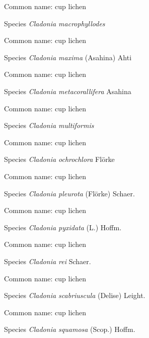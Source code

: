 \documentclass[9pt, article]{memoir}
\begin{document}
\begin{multicols}{2}
Common name: cup lichen

\vspace{6pt}\noindent\hspace{36pt}Species \textit{Cladonia macrophyllodes}


Common name: cup lichen

\vspace{6pt}\noindent\hspace{36pt}Species \textit{Cladonia maxima} (Asahina) Ahti


Common name: cup lichen

\vspace{6pt}\noindent\hspace{36pt}Species \textit{Cladonia metacorallifera} Asahina


Common name: cup lichen

\vspace{6pt}\noindent\hspace{36pt}Species \textit{Cladonia multiformis}


Common name: cup lichen

\vspace{6pt}\noindent\hspace{36pt}Species \textit{Cladonia ochrochlora} Flörke


Common name: cup lichen

\vspace{6pt}\noindent\hspace{36pt}Species \textit{Cladonia pleurota} (Flörke) Schaer.


Common name: cup lichen

\vspace{6pt}\noindent\hspace{36pt}Species \textit{Cladonia pyxidata} (L.) Hoffm.


Common name: cup lichen

\vspace{6pt}\noindent\hspace{36pt}Species \textit{Cladonia rei} Schaer.


Common name: cup lichen

\vspace{6pt}\noindent\hspace{36pt}Species \textit{Cladonia scabriuscula} (Delise) Leight.


Common name: cup lichen

\vspace{6pt}\noindent\hspace{36pt}Species \textit{Cladonia squamosa} (Scop.) Hoffm.



\end{multicols}
\end{document}
